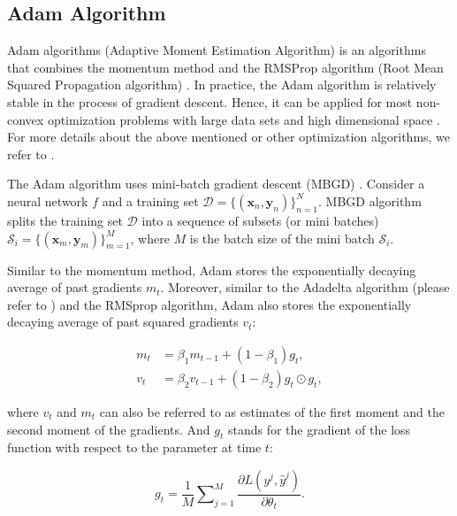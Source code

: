 \documentclass[
	parskip, 			   %
	twoside, 			   %
	DIV=14, 			   %
	BCOR=15.0mm, 		   %
	headsepline, 		   %
	open=right, 		   %
	captions=tableheading, %
	bibliography=totoc,    %
	numbers=noenddot       %
]{scrreprt}
\begin{document}
\subsection{Adam Algorithm}
Adam algorithms (Adaptive Moment Estimation Algorithm) \cite{kingma2014adam} is an algorithms that combines the momentum method \cite{qian1999momentum} and the RMSProp algorithm (Root Mean Squared Propagation algorithm) \cite{tieleman2012divide}. In practice, the Adam algorithm is relatively stable in the process of gradient descent. Hence, it can be applied for most non-convex optimization problems with large data sets and high dimensional space \cite{sun2019survey}. For more details about the above mentioned or other optimization algorithms, we refer to \cite{ruder2016overview}.

The Adam algorithm uses mini-batch gradient descent (MBGD) \cite{bottou2010large}. Consider a neural network $f$ and a training set $\mathcal{D}=\{ (\mathbf{x}_{n}, \mathbf{y}_{n}) \}_{n=1}^{N}$. MBGD algorithm splits the training set $\mathcal{D}$ into a sequence of subsets (or mini batches) $\mathcal{S}_i=\{(\mathbf{x}_{m}, \mathbf{y}_{m}) \}_{m=1}^{M}$, where $M$ is the batch size of the mini batch $\mathcal{S}_i$.

Similar to the momentum method, Adam stores the exponentially decaying average of past gradients $m_t$. Moreover, similar to the Adadelta algorithm (please refer to \cite{zeiler2012adadelta}) and the RMSprop algorithm, Adam also stores the exponentially decaying average of past squared gradients $v_t$:

\begin{equation}
    \label{eq:moment_estimate}
    \begin{aligned}
        m_t &= \beta_1 m_{t-1} + (1-\beta_1) g_{t},
        \\
        v_t &= \beta_2 v_{t-1} + (1-\beta_2) g_{t} \odot g_{t},
    \end{aligned}
\end{equation}

where $v_t$ and $m_t$ can also be referred to as estimates of the first moment and the second moment of the gradients. And $g_{t}$ stands for the gradient of the loss function with respect to the parameter at time $t$:

\begin{equation}
    \label{eq:mean_gradient}
    g_{t} = \frac{1}{M} \sum\nolimits_{j=1}^M \frac{\partial L (y^j, \hat{y}^j)}{\partial \theta_{t}}.
\end{equation}
\end{document}
